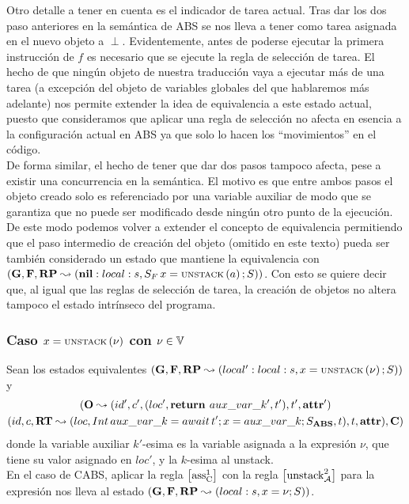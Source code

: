 Otro detalle a tener en cuenta es el indicador de tarea actual. Tras dar los dos paso anteriores en la semántica de ABS se nos lleva a tener como tarea asignada en el nuevo objeto a $\perp$. Evidentemente, antes de poderse ejecutar la primera instrucción de $f$ es necesario que se ejecute la regla de selección de tarea. El hecho de que ningún objeto de nuestra traducción vaya a ejecutar más de una tarea (a excepción del objeto de variables globales del que hablaremos más adelante) nos permite extender la idea de equivalencia a este estado actual, puesto que consideramos que aplicar una regla de selección no afecta en esencia a la configuración actual en ABS ya que solo lo hacen los ``movimientos'' en el código.\\

De forma similar, el hecho de tener que dar dos pasos tampoco afecta, pese a existir una concurrencia en la semántica. El motivo es que entre ambos pasos el objeto creado solo es referenciado por una variable auxiliar de modo que se garantiza que no puede ser modificado desde ningún otro punto de la ejecución. De este modo podemos volver a extender el concepto de equivalencia permitiendo que el paso intermedio de creación del objeto (omitido en este texto) pueda ser también considerado un estado que mantiene la equivalencia con $(\mathbf{G}, \mathbf{F}, \textbf{RP} \leadsto (\textbf{nil}:local:s, S_F\,x = \text{\scriptsize{UNSTACK}}\left(a\right)\mbox{;\,}S))$. Con esto se quiere decir que, al igual que las reglas de selección de tarea, la creación de objetos no altera tampoco el estado intrínseco del programa.

\subsubsection{Caso $x = \text{\scriptsize{UNSTACK}}\left(\nu\right)$ con $\nu \in \mathbb{V}$}
Sean los estados equivalentes $(\mathbf{G}, \mathbf{F}, \textbf{RP} \leadsto (local':local:s,x = \text{\scriptsize{UNSTACK}}\left(\nu\right)\mbox{;\,}S))$ y
\begin{multline*}
  (\mathbf{O} \leadsto (id', c', (loc', \textbf{return } aux\_var\_k', t'), t', \textbf{attr}')\\
  (id, c, \textbf{RT} \leadsto (loc, Int\, aux\_var\_k = await\,t'\mbox{;\,} x = aux\_var\_k\mbox{;\,} S_{\textbf{ABS}}, t), t, \textbf{attr}), \mathbf{C})
\end{multline*}
donde la variable auxiliar $k'$-esima es la variable asignada a la expresión $\nu$, que tiene su valor asignado en $loc'$, y la $k$-esima al unstack.\\

En el caso de CABS, aplicar la regla $\left[ \text{ass}_{\text{C}}^{1} \right]$ con la regla $\left[ \text{unstack}_{\mathcal{A}}^{2} \right]$ para la expresión nos lleva al estado $(\mathbf{G}, \mathbf{F}, \textbf{RP} \leadsto (local:s, x = \nu \mbox{;\,} S))$.\\

